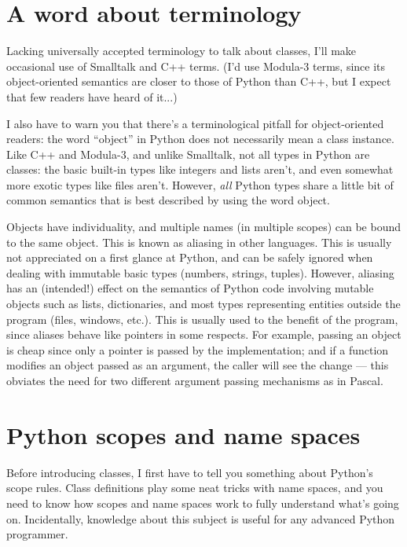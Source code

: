 \section{A word about terminology}

Lacking universally accepted terminology to talk about classes, I'll
make occasional use of Smalltalk and C++ terms.  (I'd use Modula-3
terms, since its object-oriented semantics are closer to those of
Python than C++, but I expect that few readers have heard of it...)

I also have to warn you that there's a terminological pitfall for
object-oriented readers: the word ``object'' in Python does not
necessarily mean a class instance.  Like C++ and Modula-3, and unlike
Smalltalk, not all types in Python are classes: the basic built-in
types like integers and lists aren't, and even somewhat more exotic
types like files aren't.  However, {\em all} Python types share a little
bit of common semantics that is best described by using the word
object.

Objects have individuality, and multiple names (in multiple scopes)
can be bound to the same object.  This is known as aliasing in other
languages.  This is usually not appreciated on a first glance at
Python, and can be safely ignored when dealing with immutable basic
types (numbers, strings, tuples).  However, aliasing has an
(intended!)  effect on the semantics of Python code involving mutable
objects such as lists, dictionaries, and most types representing
entities outside the program (files, windows, etc.).  This is usually
used to the benefit of the program, since aliases behave like pointers
in some respects.  For example, passing an object is cheap since only
a pointer is passed by the implementation; and if a function modifies
an object passed as an argument, the caller will see the change --- this
obviates the need for two different argument passing mechanisms as in
Pascal.


\section{Python scopes and name spaces}

Before introducing classes, I first have to tell you something about
Python's scope rules.  Class definitions play some neat tricks with
name spaces, and you need to know how scopes and name spaces work to
fully understand what's going on.  Incidentally, knowledge about this
subject is useful for any advanced Python programmer.

